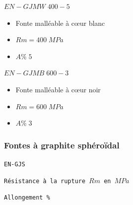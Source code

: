 \documentclass[11pt,oneside]{article}
\begin{document}
\begin{exemple}
\begin{minipage}[c]{.3\linewidth}
\begin{center}
$ EN-GJMW\;400-5$
\end{center}
\end{minipage} \hfill
\begin{minipage}[c]{.6\linewidth}
\begin{itemize}
\item Fonte malléable à c\oe{}ur blanc
\item $Rm = 400\; MPa$
\item $A\%\; 5$
\end{itemize}
\end{minipage}

\begin{minipage}[c]{.3\linewidth}
\begin{center}
$ EN-GJMB\;600-3$
\end{center}
\end{minipage} \hfill
\begin{minipage}[c]{.6\linewidth}
\begin{itemize}
\item Fonte malléable à c\oe{}ur noir
\item $Rm = 600\; MPa$
\item $A\%\; 3$
\end{itemize}
\end{minipage}
\end{exemple}


\subsubsection{Fontes à graphite sphéroïdal}

\begin{resultat}

\begin{minipage}[c]{.3\linewidth}
\begin{center}
\texttt{EN-GJS}
\end{center}
\end{minipage} \hfill
\begin{minipage}[c]{.3\linewidth}
\begin{center}
\texttt{Résistance à la rupture $Rm$ en $MPa$}
\end{center}
\end{minipage} \hfill
\begin{minipage}[c]{.3\linewidth}
\begin{center}
\texttt{Allongement \%}
\end{center}
\end{minipage} 


\end{resultat}
\end{document}
